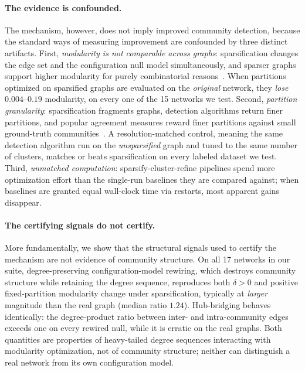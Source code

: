 \documentclass[10pt,journal,compsoc]{IEEEtran}
\begin{document}
\paragraph{The evidence is confounded.}
The mechanism, however, does not imply improved community detection, because the standard ways of measuring improvement are confounded by three distinct artifacts.
First, \emph{modularity is not comparable across graphs}: sparsification changes the edge set and the configuration null model simultaneously, and sparser graphs support higher modularity for purely combinatorial reasons~\cite{guimera2004modularity}.
When partitions optimized on sparsified graphs are evaluated on the \emph{original} network, they \emph{lose} $0.004$--$0.19$ modularity, on every one of the 15 networks we test.
Second, \emph{partition granularity}: sparsification fragments graphs, detection algorithms return finer partitions, and popular agreement measures reward finer partitions against small ground-truth communities~\cite{vinh2010information}.
A resolution-matched control, meaning the same detection algorithm run on the \emph{unsparsified} graph and tuned to the same number of clusters, matches or beats sparsification on every labeled dataset we test.
Third, \emph{unmatched computation}: sparsify-cluster-refine pipelines spend more optimization effort than the single-run baselines they are compared against; when baselines are granted equal wall-clock time via restarts, most apparent gains disappear.

\paragraph{The certifying signals do not certify.}
More fundamentally, we show that the structural signals used to certify the mechanism are not evidence of community structure.
On all 17 networks in our suite, degree-preserving configuration-model rewiring, which destroys community structure while retaining the degree sequence, reproduces both $\delta > 0$ and positive fixed-partition modularity change under sparsification, typically at \emph{larger} magnitude than the real graph (median ratio $1.24$).
Hub-bridging behaves identically: the degree-product ratio between inter- and intra-community edges exceeds one on every rewired null, while it is erratic on the real graphs.
Both quantities are properties of heavy-tailed degree sequences interacting with modularity optimization, not of community structure; neither can distinguish a real network from its own configuration model.
\end{document}
